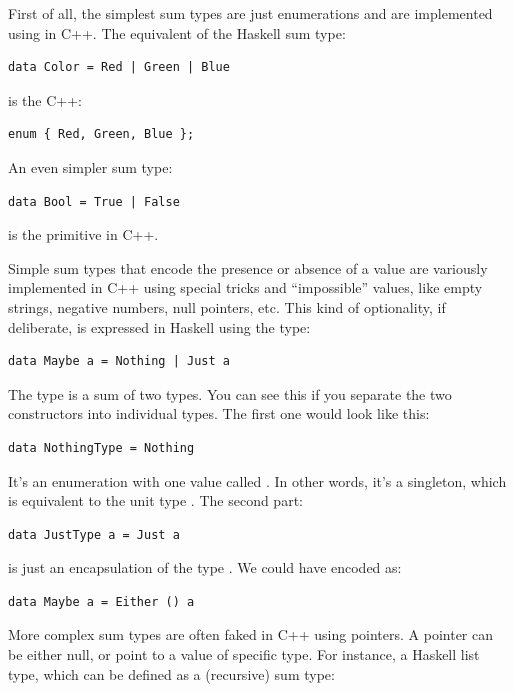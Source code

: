 First of all, the simplest sum types are just enumerations and are
implemented using  in C++. The equivalent of the Haskell
sum type:

\begin{verbatim}
data Color = Red | Green | Blue
\end{verbatim}

\noindent
is the C++:

\begin{verbatim}
enum { Red, Green, Blue };
\end{verbatim}

\noindent
An even simpler sum type:

\begin{verbatim}
data Bool = True | False
\end{verbatim}

\noindent
is the primitive  in C++.

Simple sum types that encode the presence or absence of a value are
variously implemented in C++ using special tricks and ``impossible''
values, like empty strings, negative numbers, null pointers, etc. This
kind of optionality, if deliberate, is expressed in Haskell using the
 type:

\begin{verbatim}
data Maybe a = Nothing | Just a
\end{verbatim}

\noindent
The  type is a sum of two types. You can see this if you
separate the two constructors into individual types. The first one would
look like this:

\begin{verbatim}
data NothingType = Nothing
\end{verbatim}

\noindent
It's an enumeration with one value called . In other
words, it's a singleton, which is equivalent to the unit type
\code{()}. The second part:

\begin{verbatim}
data JustType a = Just a
\end{verbatim}

\noindent
is just an encapsulation of the type . We could have encoded
 as:

\begin{verbatim}
data Maybe a = Either () a
\end{verbatim}

\noindent
More complex sum types are often faked in C++ using pointers. A pointer
can be either null, or point to a value of specific type. For instance,
a Haskell list type, which can be defined as a (recursive) sum type:

